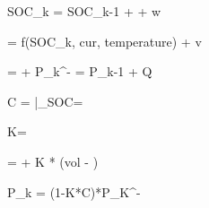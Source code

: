 SOC_{k} = SOC_{k-1} +  + w

 = f(SOC_{k}, cur, temperature) + v

 =   + 
P_{k}^{-} = P_{k-1}  + Q

C =  |_{SOC=}

K= 

  =  + K * (vol - )

P_{k} = (1-K*C)*P_{K}^{-}